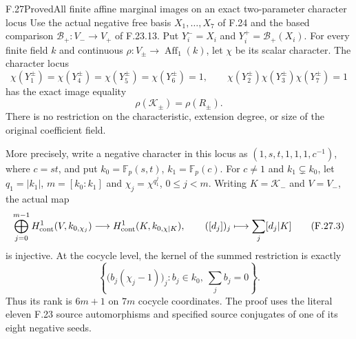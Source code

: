 \begin{claim}{F.27}{Proved}{All finite affine marginal images on an exact two-parameter character locus}
Use the actual negative free basis $X_1,\ldots,X_7$ of
F.24 and the based comparison $\mathcal B_+:V_-\to V_+$
of F.23.13. Put $Y_i^-=X_i$ and
$Y_i^+=\mathcal B_+(X_i)$. For every finite field $k$
and continuous $\rho:V_\pm\to\operatorname{Aff}_1(k)$,
let $\chi$ be its scalar character. The character locus
\[
 \chi(Y_1^\pm)=\chi(Y_4^\pm)=\chi(Y_5^\pm)
       =\chi(Y_6^\pm)=1,\qquad
 \chi(Y_2^\pm)\chi(Y_3^\pm)\chi(Y_7^\pm)=1
                                                               \tag{F.27.1}
\]
has the exact image equality
\[
                         \rho(\mathcal K_\pm)=\rho(R_\pm).
                                                               \tag{F.27.2}
\]
There is no restriction on the characteristic, extension
degree, or size of the original coefficient field.

More precisely, write a negative character in this locus as
$(1,s,t,1,1,1,c^{-1})$, where $c=st$, and put
$k_0=\mathbb F_p(s,t)$, $k_1=\mathbb F_p(c)$.
For $c\ne1$ and $k_1\subsetneq k_0$, let
$q_1=|k_1|$, $m=[k_0:k_1]$ and
$\chi_j=\chi^{q_1^j}$, $0\leq j<m$.
Writing $K=\mathcal K_-$ and $V=V_-$, the actual map
\[
 \bigoplus_{j=0}^{m-1}H^1_{\rm cont}(V,k_{0,\chi_j})
   \longrightarrow H^1_{\rm cont}(K,k_{0,\chi|K}),\qquad
                 ([d_j])_j\longmapsto\sum_j[d_j|K]
                                                               \tag{F.27.3}
\]
is injective. At the cocycle level, the kernel of
the summed restriction is exactly
\[
 \left\{\bigl(b_j(\chi_j-1)\bigr)_j:
                  b_j\in k_0,\ \sum_jb_j=0\right\}.
                                                               \tag{F.27.4}
\]
Thus its rank is $6m+1$ on $7m$ cocycle coordinates.
The proof uses the literal eleven F.23 source
automorphisms and specified source conjugates of
one of its eight negative seeds.
\end{claim}

